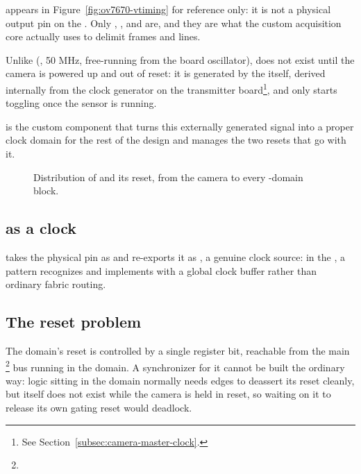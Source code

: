  appears in Figure~\ref{fig:ov7670-vtiming} for reference only: it is not a physical output pin on the . Only , , and  are, and they are what the custom acquisition  core actually uses to delimit frames and lines.

\label{sec:fpgalix-pclk-reset}

Unlike  (, 50 MHz, free-running from the board oscillator),  does not exist until the camera is powered up and out of reset: it is generated by the  itself, derived internally from the clock generator on the transmitter board\footnote{See Section~\ref{subsec:camera-master-clock}.}, and only starts toggling once the sensor is running.

 is the custom  component that turns this externally generated signal into a proper clock domain for the rest of the design and manages the two resets that go with it.

\begin{figure}[htbp]
    \centering
    
    \caption{Distribution of  and its reset, from the camera to every -domain block.}
    \label{fig:pclk-distribution}
\end{figure}

\subsection{ as a  clock}

 takes the physical  pin as  and re-exports it as , a genuine  clock source:  in the , a pattern  recognizes and implements with a global clock buffer rather than ordinary fabric routing.

\subsection{The reset problem}

The domain's reset is controlled by a single  register bit, reachable from the main \footnote{} bus running in the  domain. A synchronizer for it cannot be built the ordinary way: logic sitting in the  domain normally needs  edges to deassert its reset cleanly, but  itself does not exist while the camera is held in reset, so waiting on it to release its own gating reset would deadlock.

